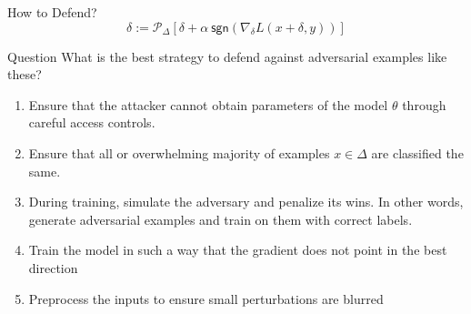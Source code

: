\documentclass[10pt]{beamer}
\begin{document}
\begin{frame}{How to Defend?}
  \[
    \delta := \mathcal{P}_\Delta
      \left[ \delta + \alpha \ \textsf{sgn}(\nabla_\delta L(x + \delta, y))\right]
  \]

  \begin{alertblock}{Question}
    What is the best strategy to defend against adversarial examples like these?
  \end{alertblock}

  \begin{enumerate}[<+->]
    \item Ensure that the attacker cannot obtain parameters of the model $\theta$ through careful
      access controls.
    \item Ensure that all or overwhelming majority of examples $x \in \Delta$ are classified
      the same.
    \item During training, simulate the adversary and penalize its wins. In other words, generate
      adversarial examples and train on them with correct labels.
    \item Train the model in such a way that the gradient does not point in the best direction
    \item Preprocess the inputs to ensure small perturbations are blurred
  \end{enumerate}

\end{frame}
\end{document}
